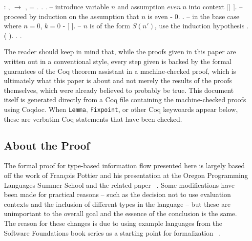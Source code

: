 \documentclass[12pt]{report}
\begin{document}
\begin{coqdoccode}
\coqdocemptyline
\coqdocnoindent
{}  : \coqdockw{\ensuremath{\forall}} ,\coqdoceol
\coqdocindent{1.00em}
  \ensuremath{\rightarrow} \coqdoctac{\ensuremath{\exists}} ,  =  .\coqdoceol
\coqdocnoindent
{}.\coqdoceol
\coqdocindent{1.00em}
  . -- introduce
    variable $n$ and assumption $even\ n$ into context \coqdoceol
\coqdocindent{1.00em}
   [|
     ]. -- proceed by induction on the
    assumption that $n$ is even \coqdoceol
\coqdocindent{1.00em}
- \coqdocindent{2.00em}
\coqdoctac{\ensuremath{\exists}} 0. . -- in the
    base case where $n=0$, $k=0$ \coqdoceol
\coqdocindent{1.00em}
- \coqdocindent{2.00em}
   [
    ]. -- $n$ is of the form $S(n')$, use the
    induction hypothesis \coqdoceol
\coqdocindent{2.00em}
 . \coqdoctac{\ensuremath{\exists}} ( ). .\coqdoceol
\coqdocnoindent
{}.\coqdoceol
\coqdocemptyline
\end{coqdoccode}



The reader should keep in mind that, while the proofs given in this
paper are written out in a conventional style, every step given is
backed by the formal guarantees of the Coq theorem assistant in
a machine-checked proof, which is ultimately what this paper is about
and not merely the results of the proofs themselves, which were
already believed to probably be true. This document itself is
generated directly from a Coq file containing the machine-checked
proofs using Coqdoc. When \texttt{Lemma}, \texttt{Fixpoint}, or other
Coq keywoards appear below, these are verbatim Coq statements that
have been checked.



\subsection{About the Proof}



The formal proof for type-based information flow presented here is
largely based off the work of François Pottier and his presentation
at the Oregon Programming Languages Summer School and the related
paper ~\cite{pottier-oregon, pottier-conchon-00}. Some modifications
have been made for practical reasons – such as the decision not to
use evaluation contexts and the inclusion of different types in the
language – but these are unimportant to the overall goal and the
essence of the conclusion is the same. The reason for these changes
is due to using example languages from the Software Foundations book
series as a starting point for formalization ~\cite{logicfounds,
progfounds}.
\end{document}
